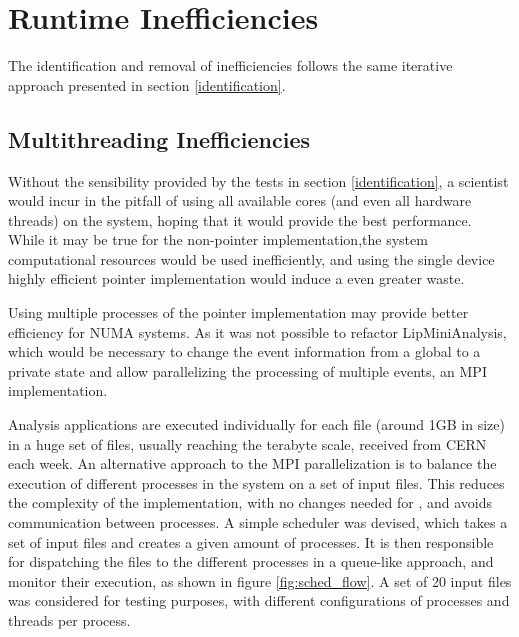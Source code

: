 \section{Runtime Inefficiencies}
\label{removal}

The identification and removal of inefficiencies follows the same iterative approach presented in section \ref{identification}.

\subsection{Multithreading Inefficiencies}

Without the sensibility provided by the tests in section \ref{identification}, a scientist would incur in the pitfall of using all available cores (and even all hardware threads) on the system, hoping that it would provide the best performance. While it may be true for the non-pointer implementation,the system computational resources would be used inefficiently, and using the single device highly efficient pointer implementation would induce a even greater waste.

Using multiple processes of the pointer implementation may provide better efficiency for NUMA systems. As it was not possible to refactor LipMiniAnalysis, which would be necessary to change the event information from a global to a private state and allow parallelizing the processing of multiple events, an MPI implementation.

Analysis applications are executed individually for each file (around 1GB in size) in a huge set of files, usually reaching the terabyte scale, received from CERN each week. An alternative approach to the MPI parallelization is to balance the execution of different \tth processes in the system on a set of input files. This reduces the complexity of the implementation, with no changes needed for \tth, and avoids communication between processes. A simple scheduler was devised, which takes a set of input files and creates a given amount of \tth processes. It is then responsible for dispatching the files to the different processes in a queue-like approach, and monitor their execution, as shown in figure \ref{fig:sched_flow}. A set of 20 input files was considered for testing purposes, with different configurations of processes and threads per process.

